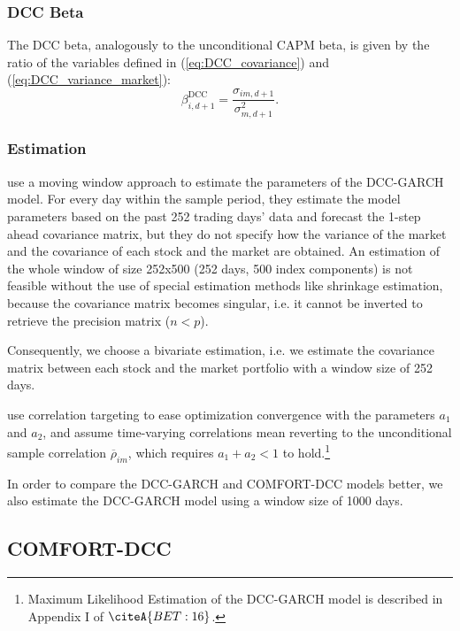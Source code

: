\documentclass[11pt,a4paper]{article}
\begin{document}
\subsubsection{DCC Beta}

The DCC beta, analogously to the unconditional CAPM beta, is given by the ratio of the variables defined in (\ref{eq:DCC_covariance}) and (\ref{eq:DCC_variance_market}):
\begin{equation}
    \beta_{i,d+1}^{\textrm{DCC}} = \dfrac{\sigma_{im,d+1}}{\sigma_{m,d+1}^2}.
\end{equation}


\subsubsection{Estimation}

 use a moving window approach to estimate the parameters of the DCC-GARCH model. For every day within the sample period, they estimate the model parameters based on the past 252 trading days' data and forecast the 1-step ahead covariance matrix, but they do not specify how the variance of the market and the covariance of each stock and the market are obtained. An estimation of the whole window of size 252x500 (252 days, 500 index components) is not feasible without the use of special estimation methods like shrinkage estimation, because the covariance matrix becomes singular, i.e. it cannot be inverted to retrieve the precision matrix ($n < p$).

Consequently, we choose a bivariate estimation, i.e. we estimate the covariance matrix between each stock and the market portfolio with a window size of 252 days.

 use correlation targeting to ease optimization convergence with the parameters $a_1$ and $a_2$, and assume time-varying correlations mean reverting to the unconditional sample correlation $\overline{\rho}_{im}$, which requires $a_1 + a_2 < 1$ to hold.\footnote{Maximum Likelihood Estimation of the DCC-GARCH model is described in Appendix I of $\citeA{BET:16}$.}

In order to compare the DCC-GARCH and COMFORT-DCC models better, we also estimate the DCC-GARCH model using a window size of 1000 days.




\subsection{COMFORT-DCC}
\end{document}
